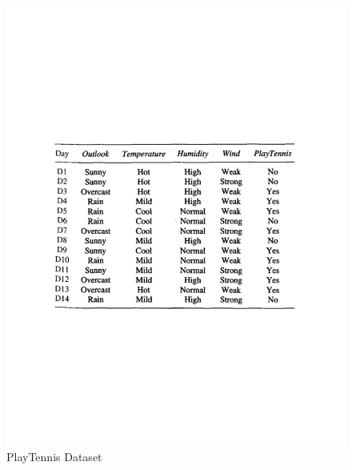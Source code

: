 \documentclass[colorlinks]{article}
\begin{document}
\begin{figure}
	\centering
	\vspace{-100pt}
	\includegraphics[scale=0.5]{dt-dataset.pdf}
	\vspace{-100pt}
	\caption{PlayTennis Dataset}
	\label{fig:dt-dataset}
\end{figure}
\end{document}
